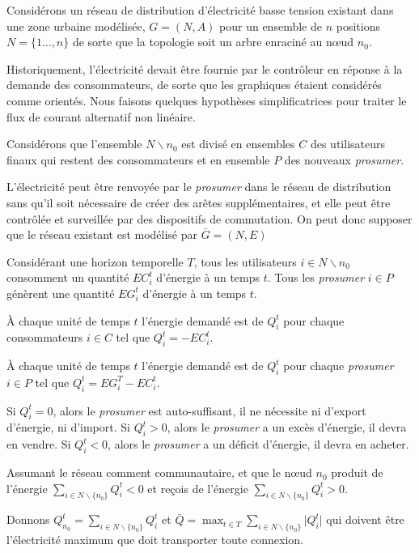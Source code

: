 Considérons un réseau de distribution d'électricité basse tension existant dans une zone urbaine modélisée,
$G = (N, A)$ pour un ensemble de $n$ positions $N = \lbrace 1 \dots, n \rbrace$ de sorte que la topologie soit un arbre enraciné
au nœud $n_0$.

Historiquement, l'électricité devait être fournie par le contrôleur en réponse à la demande des consommateurs,
de sorte que les graphiques étaient considérés comme orientés.
Nous faisons quelques hypothèses simplificatrices pour traiter le flux de courant alternatif non linéaire.

Considérons que l'ensemble $N \backslash n_0$ est divisé en ensembles $C$ des utilisateurs finaux qui restent des consommateurs et
en ensemble $P$ des nouveaux \textit{prosumer}.

L'électricité peut être renvoyée par le \textit{prosumer} dans le réseau de distribution sans qu'il soit nécessaire
de créer des arêtes supplémentaires, et elle peut être contrôlée et surveillée par des dispositifs de commutation.
On peut donc supposer que le réseau existant est modélisé par $\bar{G} = (N, E)$

Considérant une horizon temporelle $T$,
tous les utilisateurs $i \in N \backslash n_0$ consomment un quantité
$EC^t_i$ d'énergie à un temps $t$.
Tous les \textit{prosumer} $i \in P$ génèrent une quantité
$EG^t_i$ d'énergie à un temps $t$.

À chaque unité de temps $t$ l'énergie demandé est de $Q^t_i$ pour chaque consommateurs
$i \in C$ tel que $Q^t_i = -EC^t_i$.

À chaque unité de temps $t$ l'énergie demandé est de $Q^t_i$ pour chaque \textit{prosumer}
$i \in P$ tel que $Q^t_i = EG^T_i - EC^t_i$.

Si $Q^t_i = 0$, alors le \textit{prosumer} est auto-suffisant, il ne nécessite
ni d'export d'énergie, ni d'import.
Si $Q^t_i > 0$, alors le \textit{prosumer} a un excès d'énergie, il devra en vendre.
Si $Q^t_i < 0$, alors le \textit{prosumer} a un déficit d'énergie, il devra en acheter.

Assumant le réseau comment communautaire, et que le nœud $n_0$ produit de l'énergie
$\sum_{i \in N \backslash \lbrace n_0 \rbrace} Q^t_i < 0$ et reçois de l'énergie
$\sum_{i \in N \backslash \lbrace n_0 \rbrace} Q^t_i > 0$.

Donnons
$Q^t_{n_0} = \sum_{i \in N \backslash \lbrace n_0 \rbrace} Q^t_i$
et
$\bar{Q} = \max_{t \in T} \sum_{i \in N \backslash \lbrace n_0 \rbrace} \lvert Q^t_i \rvert$
qui doivent être l'électricité maximum que doit transporter toute connexion.

